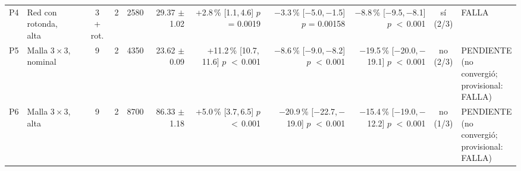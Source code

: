 \begin{table}[H]
\begin{tabular}{llcrrrrrrcl}
P4 & \makecell[l]{Red con\\{}rotonda,\\{}alta} & \makecell[c]{3\\{}+ rot.} & 2 & 2580 & \makecell[r]{29.37\\{}$\pm$ 1.02} & \makecell[r]{+2.8\,\%\\{}[1.1,\,4.6]\\$p$ = 0.0019} & \makecell[r]{$-$3.3\,\%\\{}[$-$5.0,\,$-$1.5]\\$p$ = 0.00158} & \makecell[r]{$-$8.8\,\%\\{}[$-$9.5,\,$-$8.1]\\$p$ $<$\,0.001} & \makecell[c]{sí\\{}(2/3)} & FALLA \\
P5 & \makecell[l]{Malla $3 \times 3$,\\{}nominal} & 9 & 2 & 4350 & \makecell[r]{23.62\\{}$\pm$ 0.09} & \makecell[r]{+11.2\,\%\\{}[10.7,\,11.6]\\$p$ $<$\,0.001} & \makecell[r]{$-$8.6\,\%\\{}[$-$9.0,\,$-$8.2]\\$p$ $<$\,0.001} & \makecell[r]{$-$19.5\,\%\\{}[$-$20.0,\,$-$19.1]\\$p$ $<$\,0.001} & \makecell[c]{no\\{}(2/3)} & \makecell[l]{PENDIENTE\\{}(no convergió;\\{}provisional:\\{}FALLA)} \\
P6 & \makecell[l]{Malla $3 \times 3$,\\{}alta} & 9 & 2 & 8700 & \makecell[r]{86.33\\{}$\pm$ 1.18} & \makecell[r]{+5.0\,\%\\{}[3.7,\,6.5]\\$p$ $<$\,0.001} & \makecell[r]{$-$20.9\,\%\\{}[$-$22.7,\,$-$19.0]\\$p$ $<$\,0.001} & \makecell[r]{$-$15.4\,\%\\{}[$-$19.0,\,$-$12.2]\\$p$ $<$\,0.001} & \makecell[c]{no\\{}(1/3)} & \makecell[l]{PENDIENTE\\{}(no convergió;\\{}provisional:\\{}FALLA)} \\

\end{tabular}
\end{table}
